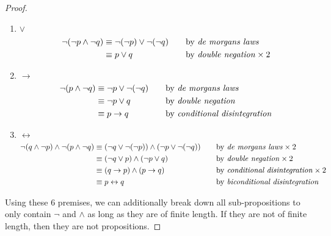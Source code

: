 \documentclass{article}
\begin{document}
\begin {enumerate}
\begin{proof}
\begin{enumerate}
            This only uses $\land$ and thus does not need to be altered to for this question.
        \item $\lor$
            \begin{align*}
                \neg(\neg p \land \neg q)
                    &\equiv \neg(\neg p) \lor \neg(\neg q)
                        &\quad
                        &\text{by \emph{de morgans laws}} 
                        \\
                    &\equiv p \lor q
                        &\quad
                        &\text{by \emph{double negation}}\times2 
                        \\
            \end{align*}
        \item $\rightarrow$
            \begin{align*}
                \neg(p \land \neg q)
                    &\equiv \neg p \lor \neg(\neg q)
                        &\quad
                        &\text{by \emph{de morgans laws}} 
                        \\
                    &\equiv \neg p \lor q
                        &\quad
                        &\text{by \emph{double negation}} 
                        \\
                    &\equiv p \rightarrow q
                        &\quad
                        &\text{by \emph{conditional disintegration}} 
                        \\
            \end{align*}
        \item $\leftrightarrow$
            \begin{align*}
                \neg(q \land \neg p) \land \neg(p \land \neg q)
                    &\equiv (\neg q \lor \neg(\neg p)) \land (\neg p \lor \neg(\neg q))
                        &\quad
                        &\text{by \emph{de morgans laws}} \times 2
                        \\
                    &\equiv (\neg q \lor p)\land (\neg p \lor q)
                        &\quad
                        &\text{by \emph{double negation}} \times2
                        \\
                    &\equiv (q \rightarrow p) \land (p \rightarrow q)
                        &\quad
                        &\text{by \emph{conditional disintegration}} \times2
                        \\
                    &\equiv p \leftrightarrow q
                        &\quad
                        &\text{by \emph{biconditional disintegration}} 
                        \\
            \end{align*}
    \end{enumerate}
    Using these 6 premises, we can additionally break down all sub-propositions to only contain $\neg$ and $\land$ as long as they are of finite length. If they are not of finite length, then they are not propositions.
    

\end{proof}
\end{enumerate}
\end{document}
